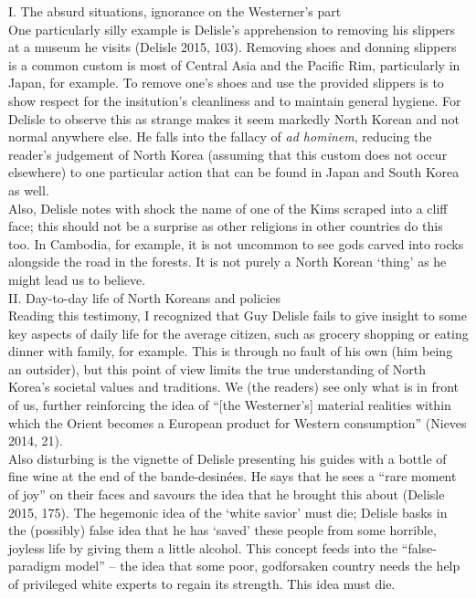\documentclass{article}
\begin{document}
I. The absurd situations, ignorance on the Westerner’s part \\

\qquad One particularly silly example is Delisle’s apprehension to removing his slippers at a museum he visits (Delisle 2015, 103). Removing shoes and donning slippers is a common custom is most of Central Asia and the Pacific Rim, particularly in Japan, for example. To remove one’s shoes and use the provided slippers is to show respect for the insitution’s cleanliness and to maintain general hygiene. For Delisle to observe this as strange makes it seem markedly North Korean and not normal anywhere else. He falls into the fallacy of \textit{ad hominem}, reducing the reader’s judgement of North Korea (assuming that this custom does not occur elsewhere) to one particular action that can be found in Japan and South Korea as well.\\

\qquad Also, Delisle notes with shock the name of one of the Kims scraped into a cliff face; this should not be a surprise as other religions in other countries do this too. In Cambodia, for example, it is not uncommon to see gods carved into rocks alongside the road in the forests. It is not purely a North Korean ‘thing’ as he might lead us to believe. \\

II. Day-to-day life of North Koreans and policies \\

\qquad Reading this testimony, I recognized that Guy Delisle fails to give insight to some key aspects of daily life for the average citizen, such as grocery shopping or eating dinner with family, for example. This is through no fault of his own (him being an outsider), but this point of view limits the true understanding of North Korea’s societal values and traditions. We (the readers) see only what is in front of us, further reinforcing the idea of “[the Westerner’s] material realities within which the Orient becomes a European product for Western consumption” (Nieves 2014, 21). \\

\qquad Also disturbing is the vignette of Delisle presenting his guides with a bottle of fine wine at the end of the bande-desinées. He says that he sees a “rare moment of joy” on their faces and savours the idea that he brought this about (Delisle 2015, 175). The hegemonic idea of the ‘white savior’ must die; Delisle basks in the (possibly) false idea that he has ‘saved’ these people from some horrible, joyless life by giving them a little alcohol. This concept feeds into the “false-paradigm model” – the idea that some poor, godforsaken country needs the help of privileged white experts to regain its strength. This idea must die. \\
\end{document}
